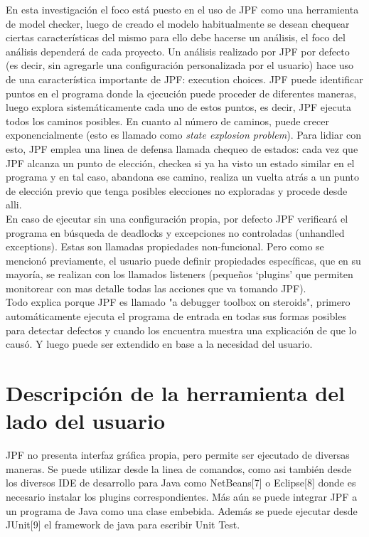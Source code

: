 \documentclass[runningheads]{llncs}
\begin{document}
En esta investigaci\'on el foco est\'a puesto en el uso de JPF como una herramienta de model checker, luego de creado el modelo habitualmente se desean chequear ciertas  caracter\'isticas del mismo para ello debe hacerse un an\'alisis, el foco del an\'alisis depender\'a de cada proyecto. Un an\'alisis realizado por JPF por defecto (es decir, sin agregarle una configuraci\'on personalizada por el usuario) hace uso de una caracter\'istica importante de JPF: execution choices. JPF puede identificar puntos en el programa donde la ejecuci\'on puede proceder de diferentes maneras, luego explora sistem\'aticamente cada uno de estos puntos, es decir, JPF ejecuta todos los caminos posibles. En cuanto al n\'umero de caminos, puede crecer exponencialmente (esto es llamado como \textit{state explosion problem}). Para lidiar con esto, JPF emplea una linea de defensa llamada chequeo de estados: cada vez que JPF alcanza un punto de elecci\'on, checkea si ya ha visto un estado similar en el programa y en tal caso, abandona ese camino, realiza un vuelta atr\'as a un punto de elecci\'on previo que tenga posibles elecciones no exploradas y procede desde alli.\\
En caso de ejecutar sin una configuraci\'on propia, por defecto JPF verificar\'a el programa en b\'usqueda de deadlocks y excepciones no controladas (unhandled exceptions). Estas son llamadas propiedades non-funcional. Pero como se mencion\'o previamente, el usuario puede definir propiedades espec\'ificas, que en su mayor\'ia, se realizan con los llamados listeners (peque\~nos ‘plugins’ que permiten monitorear con mas detalle todas las acciones que va tomando JPF).\\
Todo explica porque JPF es llamado "a debugger toolbox on steroids", primero autom\'aticamente ejecuta el programa de entrada en todas sus formas posibles para detectar defectos y cuando los encuentra muestra una explicaci\'on de que lo caus\'o. Y luego puede ser extendido en base a la necesidad del usuario.


\section{Descripci\'on de la herramienta del lado del usuario}

JPF no presenta interfaz gr\'afica propia, pero permite ser ejecutado de diversas maneras. Se puede utilizar desde la linea de comandos, como asi tambi\'en desde los diversos IDE de desarrollo para Java como NetBeans[7] o Eclipse[8] donde es necesario instalar los plugins correspondientes. M\'as a\'un se puede integrar JPF a un programa de Java como una clase embebida.
Adem\'as se puede ejecutar desde JUnit[9] el framework de java para escribir Unit Test.
\end{document}
